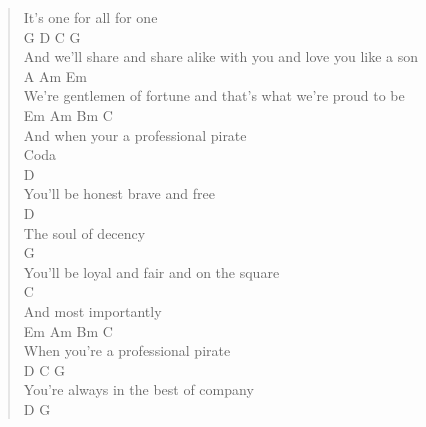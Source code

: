\documentclass[11pt]{article}
\begin{document}
\begin{verse}
It's one for all for one\\
\hspace*{11em}G               D                  C              G\\
And we'll share and share alike with you and love you like a son\\
A     Am                                   Em\\
We're gentlemen of fortune and that's what we're proud to be\\
Em   Am     Bm    C\\
And when your a professional pirate\\
\vspace*{1em}
\vspace*{1em}
Coda\\
D\\
You'll be honest brave and free\\
D\\
The soul of decency\\
G\\
You'll be loyal and fair and on the square\\
C\\
And most importantly\\
Em   Am     Bm    C\\
When you're a professional pirate\\
D       C                G\\
You're always in the best of company\\
D  G\\
\end{verse}
\clearpage
\end{document}
